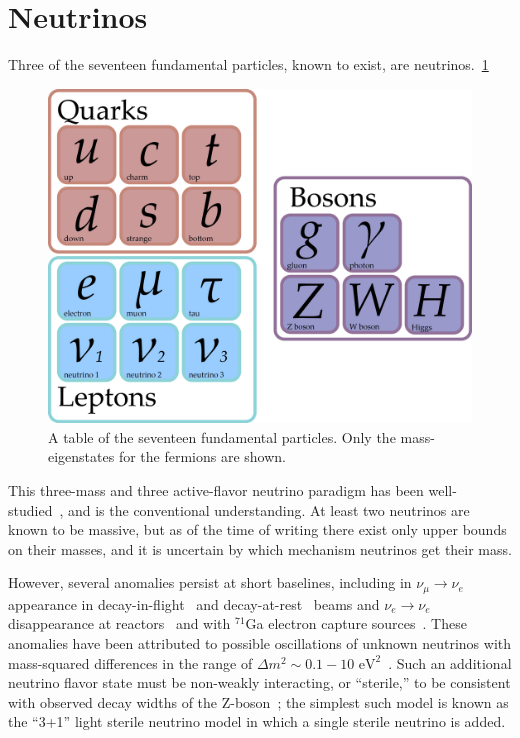 \documentclass[main.tex]{subfiles}
\begin{document}
\section{Neutrinos}



Three of the seventeen fundamental particles, known to exist, are neutrinos.~\ref{fig:party}
\begin{figure}
    \centering
    \includegraphics[width=0.8\linewidth]{figures/particles.png}
    \caption{A table of the seventeen fundamental particles. Only the mass-eigenstates for the fermions are shown.}\label{fig:party}
\end{figure}
This three-mass and three active-flavor neutrino  paradigm has been well-studied~\cite{PhysRevD.98.030001,Esteban_2019,de_Salas_2018,Capozzi_2016,zboson2006, berns2021recent}, and is the conventional understanding.
At least two neutrinos are known to be massive, but as of the time of writing there exist only upper bounds on their masses, and it is uncertain by which mechanism neutrinos get their mass.

However, several anomalies persist at short baselines, including in $\nu_\mu\rightarrow\nu_e $ appearance in decay-in-flight~\cite{aguilar2018significant} and decay-at-rest~\cite{Athanassopoulos_1998} beams  and $\nu_e\rightarrow\nu_e$ disappearance at reactors~\cite{mention2011reactor,serebrov2019first}  and with $^{71}$Ga electron capture sources~\cite{PhysRevC.73.045805,giunti2011statistical}.  
These anomalies have been attributed to possible oscillations of unknown neutrinos with mass-squared differences in the range of $\Delta m^{2}\sim 0.1-10\text{ eV}^{2}$~\cite{abazajian2012light}.   
Such an additional neutrino flavor state must be non-weakly interacting, or ``sterile,'' to be consistent with observed decay widths of the Z-boson~\cite{zboson2006}; the simplest such model is known as the ``3+1'' light sterile neutrino model in which a single sterile neutrino is added. 
\end{document}
